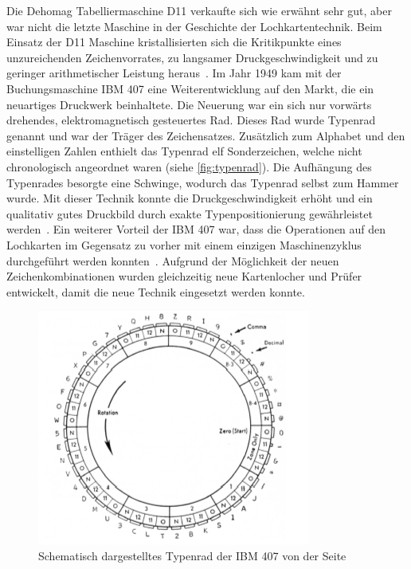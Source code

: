 \documentclass[parskip=half]{scrartcl}
\begin{document}
Die Dehomag Tabelliermaschine D11 verkaufte sich wie erwähnt sehr gut, aber war
nicht die letzte Maschine in der Geschichte der Lochkartentechnik. Beim Einsatz
der D11 Maschine kristallisierten sich die Kritikpunkte eines unzureichenden
Zeichenvorrates, zu langsamer Druckgeschwindigkeit und zu geringer
arithmetischer Leistung heraus~\cite{sandner}. Im Jahr 1949 kam mit der
Buchungsmaschine IBM 407 eine Weiterentwicklung auf den Markt, die ein
neuartiges Druckwerk beinhaltete. Die Neuerung war ein sich nur vorwärts
drehendes, elektromagnetisch gesteuertes Rad. Dieses Rad wurde Typenrad genannt
und war der Träger des Zeichensatzes. Zusätzlich zum Alphabet und den
einstelligen Zahlen enthielt das Typenrad elf Sonderzeichen, welche nicht
chronologisch angeordnet waren (siehe \autoref{fig:typenrad}). Die Aufhängung
des Typenrades besorgte eine Schwinge, wodurch das Typenrad selbst zum Hammer
wurde. Mit dieser Technik konnte die Druckgeschwindigkeit erhöht und ein
qualitativ gutes Druckbild durch exakte Typenpositionierung gewährleistet
werden~\cite{sandner}. Ein weiterer Vorteil der IBM 407 war, dass die
Operationen auf den Lochkarten im Gegensatz zu vorher mit einem einzigen
Maschinenzyklus durchgeführt werden konnten~\cite{Boyell}. Aufgrund der
Möglichkeit der neuen Zeichenkombinationen wurden gleichzeitig neue
Kartenlocher und Prüfer entwickelt, damit die neue Technik eingesetzt werden
konnte.

\begin{figure}[h]
  \centering
  \includegraphics{typenrad}
  \caption{Schematisch dargestelltes Typenrad der IBM 407 von der Seite~\cite{sandner}}
  \label{fig:typenrad}
\end{figure}
\end{document}
